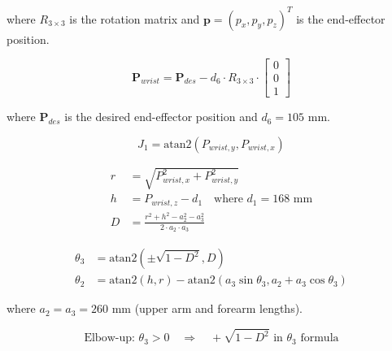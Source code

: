 \documentclass[border=10pt, convert={png300}]{standalone}
\begin{document}
where $R_{3\times3}$ is the rotation matrix and $\mathbf{p} = (p_x, p_y, p_z)^T$ is the end-effector position.


\[
\mathbf{P}_{wrist} = \mathbf{P}_{des} - d_6 \cdot R_{3\times3} \cdot \begin{bmatrix} 0 \\ 0 \\ 1 \end{bmatrix}
\]

where $\mathbf{P}_{des}$ is the desired end-effector position and $d_6 = 105$ mm.


\[
J_1 = \text{atan2}(P_{wrist,y}, P_{wrist,x})
\]


\[
\begin{aligned}
r &= \sqrt{P_{wrist,x}^2 + P_{wrist,y}^2} \\
h &= P_{wrist,z} - d_1 \quad \text{where } d_1 = 168 \text{ mm} \\
D &= \frac{r^2 + h^2 - a_2^2 - a_3^2}{2 \cdot a_2 \cdot a_3}
\end{aligned}
\]

\[
\begin{aligned}
\theta_3 &= \text{atan2}\left(\pm\sqrt{1-D^2}, D\right) \\
\theta_2 &= \text{atan2}(h, r) - \text{atan2}\left(a_3\sin\theta_3, a_2 + a_3\cos\theta_3\right)
\end{aligned}
\]

where $a_2 = a_3 = 260$ mm (upper arm and forearm lengths).


\[
\text{Elbow-up: } \theta_3 > 0 \quad \Longrightarrow \quad +\sqrt{1-D^2} \text{ in } \theta_3 \text{ formula}
\]
\end{document}
